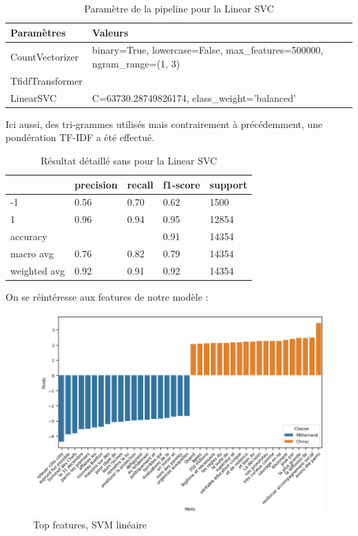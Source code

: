 \documentclass{article}
\begin{document}
\begin{table}[H]
    \centering
    \begin{tabular}{ll}
        Paramètres & Valeurs \\ \hline
        CountVectorizer & binary=True, lowercase=False, max\_features=500000, ngram\_range=(1, 3) \\ 
        TfidfTransformer & ~ \\ 
        LinearSVC & C=63730.28749826174, class\_weight='balanced' \\ 
    \end{tabular}
    \caption{Paramètre de la pipeline pour la Linear SVC}
    \label{table:SVC_pipeline}
\end{table}

Ici aussi, des tri-grammes utilisés mais contrairement à précédemment, une pondération TF-IDF a été effectué. 

\begin{table}[H]
    \centering
    \begin{tabular}{lllll}
        ~ & precision & recall & f1-score & support \\ \hline
        -1 & 0.56 & 0.70 & 0.62 & 1500 \\ 
        1 & 0.96 & 0.94 & 0.95 & 12854 \\ 
        accuracy & ~ & ~ & 0.91 & 14354 \\ 
        macro avg & 0.76 & 0.82 & 0.79 & 14354 \\ 
        weighted avg & 0.92 & 0.91 & 0.92 & 14354 \\ 
    \end{tabular}
    \caption{Résultat détaillé sans pour la Linear SVC}
    \label{table:SVC}
\end{table}

On se réintéresse aux features de notre modèle :

\begin{figure}[H]
    \centering
    \includegraphics[width=\textwidth]{./src/locuteur/param_analysis_SVC.png}
    \caption{Top features, SVM linéaire}
    \label{features_svm}
\end{figure}
\end{document}
